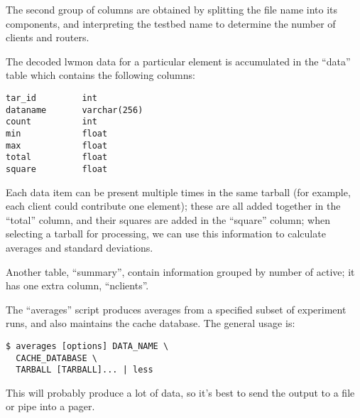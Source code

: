 \documentclass[a4paper,11pt,twocolumn]{article}
\begin{document}
The second group of columns are obtained by splitting the file name
into its components, and interpreting the testbed name to determine
the number of clients and routers.

The decoded lwmon data for a particular element is accumulated in the
``data'' table which contains the following columns:

\begin{small}
\begin{verbatim}
tar_id         int
dataname       varchar(256)
count          int
min            float
max            float
total          float
square         float
\end{verbatim}
\end{small}

Each data item can be present multiple times in the same tarball
(for example, each client could contribute one element); these are
all added together in the ``total'' column, and their squares are
added in the ``square'' column; when selecting a tarball for
processing, we can use this information to calculate averages and
standard deviations.

Another table, ``summary'', contain information grouped by number of
active; it has one extra column, ``n{\textunderscore}clients''.

The ``averages'' script produces averages from a specified subset of
experiment runs, and also maintains the cache database.  The general
usage is:

\begin{small}
\begin{verbatim}
$ averages [options] DATA_NAME \
  CACHE_DATABASE \
  TARBALL [TARBALL]... | less
\end{verbatim}
\end{small}

This will probably produce a lot of data, so it's best to send the output
to a file or pipe into a pager.
\end{document}
